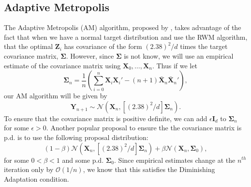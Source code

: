 \documentclass[twoside]{article}
\begin{document}
\subsection{Adaptive Metropolis}
The Adaptive Metropolis (AM) algorithm, proposed by \citet{haario2001adaptive}, takes advantage of the fact that when we have a normal target distribution and use the RWM algorithm, that the optimal $\mathbf{Z}_i$ has covariance of the form $(2.38)^2/d$ times the target covariance matrix, $\boldsymbol{\Sigma}$. However, since $\boldsymbol{\Sigma}$ is not know, we will use an empirical estimate of the covariance matrix using $\mathbf{X}_0, \dots, \mathbf{X}_n$. Thus if we let $$\boldsymbol{\Sigma}_n = \frac{1}{n}\left(\sum_{i=0}^n \mathbf{X}_i \mathbf{X}_i' - (n+1)\bar{\mathbf{X}}_n \bar{\mathbf{X}}_n' \right),$$
our AM algorithm will be given by
$$\mathbf{Y}_{n+1} \sim \mathcal{N}(\mathbf{X}_n, [(2.38)^2/d]\boldsymbol{\Sigma}_n).$$
To ensure that the covariance matrix is positive definite, we can add $\epsilon \mathbf{I}_d$ to $\boldsymbol{\Sigma}_n$ for some $\epsilon > 0$. Another popular proposal to ensure the the covariance matrix is p.d. is to use the following proposal distribution:
$$(1-\beta)\mathcal{N}(\mathbf{X}_n, [(2.38)^2/d]\boldsymbol{\Sigma}_n) + \beta \mathcal{N}(\mathbf{X}_n, \boldsymbol{\Sigma}_0),$$
for some $0 <\beta < 1$ and some p.d. $\boldsymbol{\Sigma}_0$. Since empirical estimates change at the $n^{th}$ iteration only by $\mathcal{O}(1/n)$, we know that this satisfies the Diminishing Adaptation condition.
\end{document}
